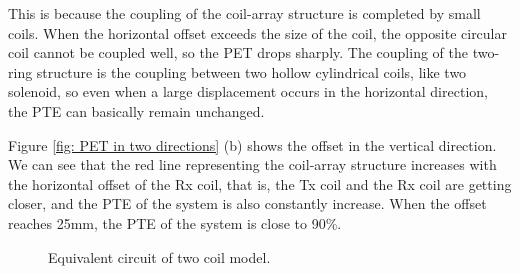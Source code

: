 This is because the coupling of the coil-array structure is completed by small coils. When the horizontal offset exceeds the size of the coil, the opposite circular coil cannot be coupled 
well, so the PET drops sharply. The coupling of the two-ring structure is the coupling between two hollow cylindrical coils, like two solenoid, so even when a large displacement occurs in the horizontal direction, the PTE can basically remain unchanged.

Figure \ref{fig: PET in two directions} (b) shows the offset in the vertical direction. We can see that the red line representing the coil-array structure increases with the horizontal offset of the Rx coil, that is, the Tx coil and the Rx coil are getting closer, and the PTE of the system is also constantly increase. When the offset reaches 25mm, the PTE of the system is close to 90\%.

\begin{figure}[!t]
    \centering
    \caption{Equivalent circuit of two coil model.}
    \label{fig: direction}
\end{figure}

